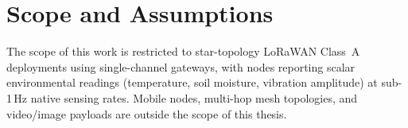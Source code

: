 \section{Scope and Assumptions}
The scope of this work is restricted to star-topology LoRaWAN Class~A deployments using
single-channel gateways, with nodes reporting scalar environmental readings (temperature,
soil moisture, vibration amplitude) at sub-1\,Hz native sensing rates. Mobile nodes,
multi-hop mesh topologies, and video/image payloads are outside the scope of this thesis.
